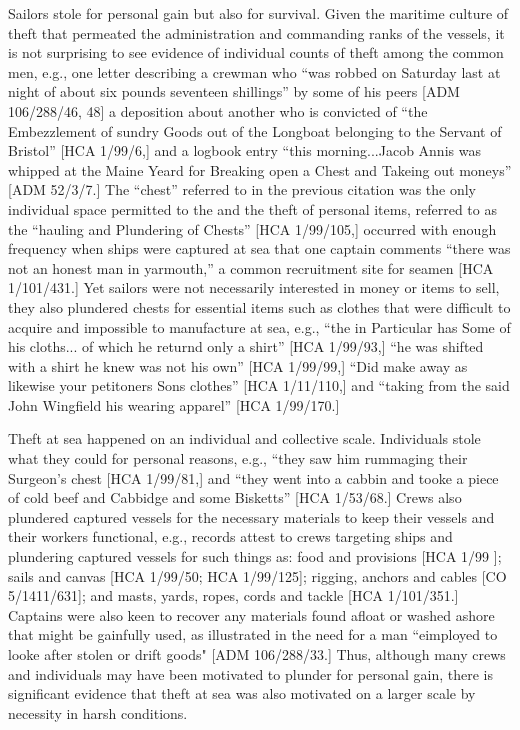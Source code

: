 Sailors stole for personal gain but also for survival. Given the maritime culture of theft that permeated the administration and commanding ranks of the vessels, it is not surprising to see evidence of individual counts of theft among the common men, e.g., one letter describing a crewman who “was robbed on Saturday last at night of about six pounds seventeen shillings” by some of his peers [ADM 106/288/46, 48] a deposition about another  who is convicted of “the Embezzlement of sundry Goods out of the Longboat belonging to the Servant of Bristol” [HCA 1/99/6,] and a logbook entry “this morning...Jacob Annis was whipped at the Maine Yeard for Breaking open a Chest and Takeing out moneys” [ADM 52/3/7.] The “chest” referred to in the previous citation was the only individual space permitted to the  and the theft of personal items, referred to as the “hauling and Plundering of Chests” [HCA 1/99/105,] occurred with enough frequency when ships were captured at sea that one captain comments “there was not an honest man in yarmouth,” a common recruitment site for seamen [HCA 1/101/431.] Yet sailors were not necessarily interested in money or items to sell, they also plundered chests for essential items such as clothes that were difficult to acquire and impossible to manufacture at sea, e.g., “the  in Particular has Some of his cloths... of which he returnd only a shirt” [HCA 1/99/93,] “he was shifted with a shirt he knew was not his own” [HCA 1/99/99,] “Did make away as likewise your petitoners Sons clothes” [HCA 1/11/110,] and “taking from the said John Wingfield his wearing apparel” [HCA 1/99/170.] 

Theft at sea happened on an individual and collective scale. Individuals stole what they could for personal reasons, e.g., “they saw him rummaging their Surgeon’s chest [HCA 1/99/81,] and “they went into a cabbin and tooke a piece of cold beef and Cabbidge and some Bisketts” [HCA 1/53/68.] Crews also plundered captured vessels for the necessary materials to keep their vessels and their workers functional, e.g., records attest to crews targeting ships and plundering captured vessels for such things as: food and provisions [HCA 1/99  \citealt{Islands1722}]; sails and canvas [HCA 1/99/50; HCA 1/99/125]; rigging, anchors and cables [CO 5/1411/631]; and masts, yards, ropes, cords and tackle [HCA 1/101/351.] Captains were also keen to recover any materials found afloat or washed ashore that might be gainfully used, as illustrated in the need for a man “eimployed to looke after stolen or drift goods" [ADM 106/288/33.] Thus, although many crews and individuals may have been motivated to plunder for personal gain, there is significant evidence that theft at sea was also motivated on a larger scale by necessity in harsh conditions. 

